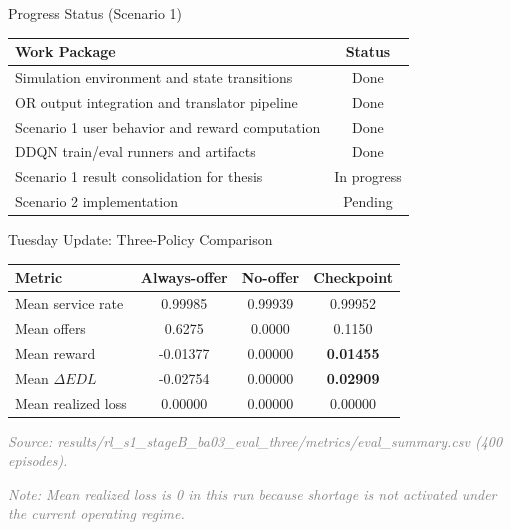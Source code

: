 ﻿\documentclass[aspectratio=169]{beamer}
\newcommand{\ph}[1]{\textcolor{gray}{\textit{#1}}}
\begin{document}
\begin{frame}{Progress Status (Scenario 1)}
\begin{table}
\small
\centering
\begin{tabular}{>{\raggedright\arraybackslash}p{} c}
\toprule
Work Package & Status \\
\midrule
Simulation environment and state transitions & Done \\
OR output integration and translator pipeline & Done \\
Scenario 1 user behavior and reward computation & Done \\
DDQN train/eval runners and artifacts & Done \\
Scenario 1 result consolidation for thesis & In progress \\
Scenario 2 implementation & Pending \\
\bottomrule
\end{tabular}
\end{table}
\end{frame}

\begin{frame}{Tuesday Update: Three-Policy Comparison}
\small
\begin{table}
\centering
\begin{tabular}{>{\raggedright\arraybackslash}p{}ccc}
\toprule
Metric & Always-offer & No-offer & Checkpoint \\
\midrule
Mean service rate & 0.99985 & 0.99939 & 0.99952 \\
Mean offers & 0.6275 & 0.0000 & 0.1150 \\
Mean reward & -0.01377 & 0.00000 & \textbf{0.01455} \\
Mean $\Delta EDL$ & -0.02754 & 0.00000 & \textbf{0.02909} \\
Mean realized loss & 0.00000 & 0.00000 & 0.00000 \\
\bottomrule
\end{tabular}
\end{table}

\vspace{0.4em}
\ph{Source: results/rl\_s1\_stageB\_ba03\_eval\_three/metrics/eval\_summary.csv (400 episodes).}

\vspace{0.2em}
\ph{Note: Mean realized loss is 0 in this run because shortage is not activated under the current operating regime.}
\end{frame}
\end{document}
